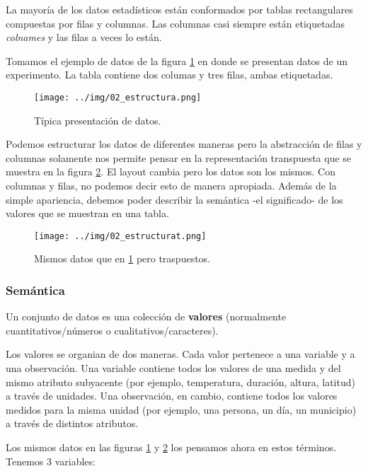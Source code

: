 \documentclass[]{article}
\begin{document}
La mayoría de los datos estadísticos están conformados por tablas
rectangulares compuestas por filas y columnas. Las columnas casi siempre
están etiquetadas \emph{colnames} y las filas a veces lo están.

Tomamos el ejemplo de datos de la figura \ref{fig:estructura} en donde
se presentan datos de un experimento. La tabla contiene dos columas y
tres filas, ambas etiquetadas.

\begin{figure}[h]
    \centering
    \texttt{[image: ../img/02\_estructura.png]}
    \caption{Típica presentación de datos.}
    \label{fig:estructura}
\end{figure}

Podemos estructurar los datos de diferentes maneras pero la abstracción
de filas y columnas solamente nos permite pensar en la representación
transpuesta que se muestra en la figura \ref{fig:estructurat}. El layout
cambia pero los datos son los mismos. Con columnas y filas, no podemos
decir esto de manera apropiada. Además de la simple apariencia, debemos
poder describir la semántica -el significado- de los valores que se
muestran en una tabla.

\begin{figure}[h]
    \centering
    \texttt{[image: ../img/02\_estructurat.png]}
    \caption{Mismos datos que en \ref{fig:estructura} pero traspuestos.}
    \label{fig:estructurat}
\end{figure}

\subsubsection{Semántica}\label{semantica}

Un conjunto de datos es una colección de \textbf{valores} (normalmente
cuantitativos/números o cualitativos/caracteres).

Los valores se organian de dos maneras. Cada valor pertenece a una
variable y a una observación. Una variable contiene todos los valores de
una medida y del mismo atributo subyacente (por ejemplo, temperatura,
duración, altura, latitud) a través de unidades. Una observación, en
cambio, contiene todos los valores medidos para la misma unidad (por
ejemplo, una persona, un día, un municipio) a través de distintos
atributos.

Los mismos datos en las figuras \ref{fig:estructura} y
\ref{fig:estructurat} los pensamos ahora en estos términos. Tenemos 3
variables:
\end{document}
